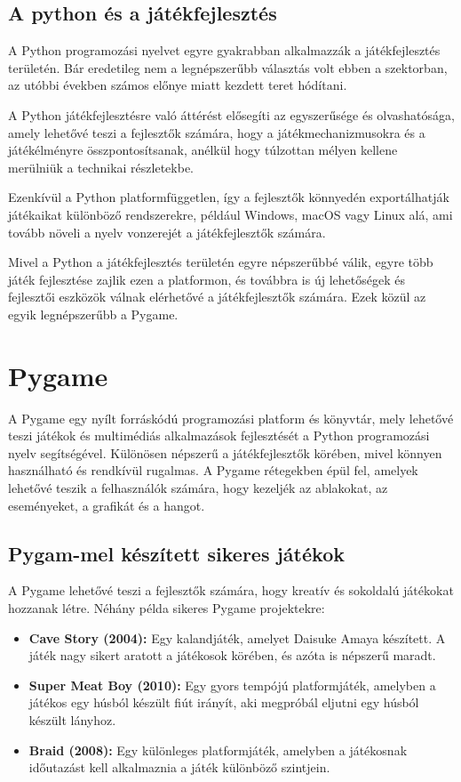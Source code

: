 \subsection{A python és a játékfejlesztés}
\indent \indent A Python programozási nyelvet egyre gyakrabban alkalmazzák a játékfejlesztés területén.\cite{python-in-game-dev} Bár eredetileg nem a legnépszerűbb választás volt ebben a szektorban, az utóbbi években számos előnye miatt kezdett teret hódítani.

A Python játékfejlesztésre való áttérést elősegíti az egyszerűsége és olvashatósága, amely lehetővé teszi a fejlesztők számára, hogy a játékmechanizmusokra és a játékélményre összpontosítsanak, anélkül hogy túlzottan mélyen kellene merülniük a technikai részletekbe.

Ezenkívül a Python platformfüggetlen, így a fejlesztők könnyedén exportálhatják játékaikat különböző rendszerekre, például Windows, macOS vagy Linux alá, ami tovább növeli a nyelv vonzerejét a játékfejlesztők számára.

Mivel a Python a játékfejlesztés területén egyre népszerűbbé válik, egyre több játék fejlesztése zajlik ezen a platformon, és továbbra is új lehetőségek és fejlesztői eszközök válnak elérhetővé a játékfejlesztők számára. Ezek közül az egyik legnépszerűbb a Pygame.

\section{Pygame}
\indent \indent A Pygame\cite{pygame} egy nyílt forráskódú programozási platform és könyvtár, mely lehetővé teszi játékok és multimédiás alkalmazások fejlesztését a Python programozási nyelv segítségével. Különösen népszerű a játékfejlesztők körében, mivel könnyen használható és rendkívül rugalmas. A Pygame rétegekben épül fel, amelyek lehetővé teszik a felhasználók számára, hogy kezeljék az ablakokat, az eseményeket, a grafikát és a hangot.

\subsection{Pygam-mel készített sikeres játékok}
\indent \indent A Pygame lehetővé teszi a fejlesztők számára, hogy kreatív és sokoldalú játékokat hozzanak létre. Néhány példa sikeres Pygame projektekre:

\begin{itemize}
    \item \textbf{Cave Story\cite{CaveStory} (2004):} Egy kalandjáték, amelyet Daisuke Amaya készített. A játék nagy sikert aratott a játékosok körében, és azóta is népszerű maradt. 
    \item \textbf{Super Meat Boy\cite{SuperMeatBoy} (2010):} Egy gyors tempójú platformjáték, amelyben a játékos egy húsból készült fiút irányít, aki megpróbál eljutni egy húsból készült lányhoz.
    \item \textbf{Braid\cite{Braid} (2008):} Egy különleges platformjáték, amelyben a játékosnak időutazást kell alkalmaznia a játék különböző szintjein.
\end{itemize}


